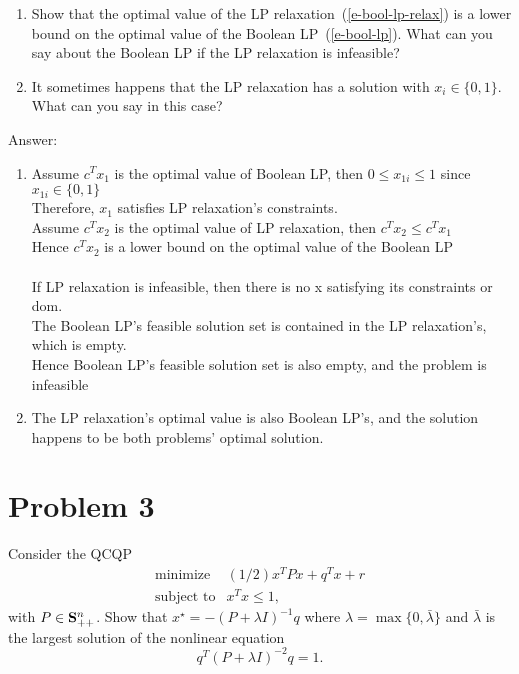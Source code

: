 \documentclass{article}
\newcommand{\symm}{{\bf{S}}}
\theoremstyle{definition}
\theoremstyle{definition}
\theoremstyle{remark}
\begin{document}
\begin{enumerate}
\item Show that the optimal value of the LP relaxation~(\ref{e-bool-lp-relax}) is a lower bound on the optimal value of the Boolean LP~(\ref{e-bool-lp}).  What can you say about the Boolean LP if the LP relaxation is infeasible?
    
\item It sometimes happens that the LP relaxation has a solution with $x_i \in \{ 0,1\}$.  What can you say in this case?
\end{enumerate}

{\bf{Answer:
\begin{enumerate}
    \item Assume $c^Tx_1$ is the optimal value of Boolean LP, then $0\leq x_{1i}\leq1$ since $x_{1i}\in\{0,1\}$
    \\Therefore, $x_1$ satisfies LP relaxation's constraints.
    \\Assume $c^Tx_2$ is the optimal value of LP relaxation, then $c^Tx_2\leq c^Tx_1$
    \\Hence $c^Tx_2$ is a lower bound on the optimal value of the Boolean LP 
    \\\\If LP relaxation is infeasible, then there is no x satisfying its constraints or dom.
    \\The Boolean LP's feasible solution set is contained in the LP relaxation's, which is empty.
    \\Hence Boolean LP's feasible solution set is also empty, and the problem is infeasible
    \item The LP relaxation's optimal value is also Boolean LP's, and the solution happens to be both problems' optimal solution.
\end{enumerate}
}}

\section*{Problem 3}\label{exe-sep-hyp-strict-counterexample}
Consider the QCQP
\[
\begin{array}{ll}
\mbox{minimize} & (1/2)x^T Px + q^T x + r \\
\mbox{subject to} & x^T x \leqslant 1,
\end{array}
\]
with $P\in\symm^n_{++}$.  Show that $x^\star = -(P+\lambda I)^{-1} q$
where $\lambda = \max\{0, \bar \lambda\}$
and $\bar\lambda$ is the largest solution of the nonlinear equation
\[
q^T (P+\lambda I)^{-2} q  = 1.
\]
\end{document}
